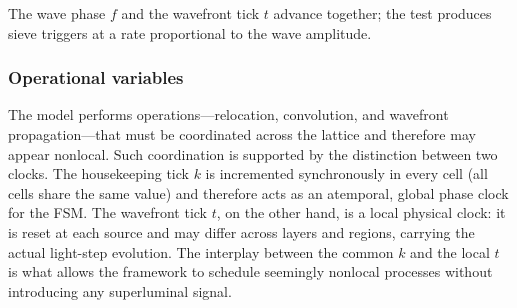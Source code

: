 \documentclass{ijuc}
\begin{document}
The wave phase $f$ and the wavefront tick $t$ advance together; the test produces sieve triggers at a rate proportional to the wave amplitude.
 
\subsubsection{Operational variables}

The model performs operations---relocation, convolution, and wavefront propagation---that must be coordinated across the lattice and therefore may appear nonlocal. Such coordination is supported by the distinction between two clocks. The housekeeping tick $k$ is incremented synchronously in every cell (all cells share the same value) and therefore acts as an atemporal, global phase clock for the FSM. The wavefront tick $t$, on the other hand, is a local physical clock: it is reset at each source and may differ across layers and regions, carrying the actual light-step evolution. The interplay between the common $k$ and the local $t$ is what allows the framework to schedule seemingly nonlocal processes without introducing any superluminal signal.
\end{document}

